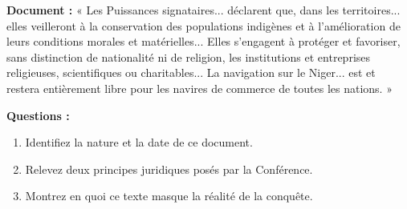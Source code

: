 \documentclass[11pt]{article}
\begin{document}
\begin{exoresolu}
\textbf{Document :} « Les Puissances signataires... déclarent que, dans les territoires... elles veilleront à la conservation des populations indigènes et à l'amélioration de leurs conditions morales et matérielles... Elles s'engagent à protéger et favoriser, sans distinction de nationalité ni de religion, les institutions et entreprises religieuses, scientifiques ou charitables... La navigation sur le Niger... est et restera entièrement libre pour les navires de commerce de toutes les nations. »

\textbf{Questions :}
\begin{enumerate}
    \item Identifiez la nature et la date de ce document.
    \item Relevez deux principes juridiques posés par la Conférence.
    \item Montrez en quoi ce texte masque la réalité de la conquête.
\end{enumerate}

\tcblower


\end{exoresolu}
\end{document}
